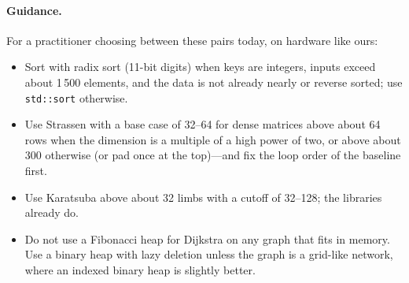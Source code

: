 \paragraph{Guidance.}
For a practitioner choosing between these pairs today, on hardware like
ours:
\begin{itemize}\itemsep0pt
  \item Sort with radix sort (11-bit digits) when keys are integers, inputs
  exceed about 1\,500 elements, and the data is not already nearly or
  reverse sorted; use \texttt{std::sort} otherwise.
  \item Use Strassen with a base case of 32--64 for dense matrices above
  about 64 rows when the dimension is a multiple of a high power of two,
  or above about 300 otherwise (or pad once at the top)---and fix the loop
  order of the baseline first.
  \item Use Karatsuba above about 32 limbs with a cutoff of 32--128; the
  libraries already do.
  \item Do not use a Fibonacci heap for Dijkstra on any graph that fits in
  memory. Use a binary heap with lazy deletion unless the graph is a grid-like
  network, where an indexed binary heap is slightly better.
\end{itemize}
